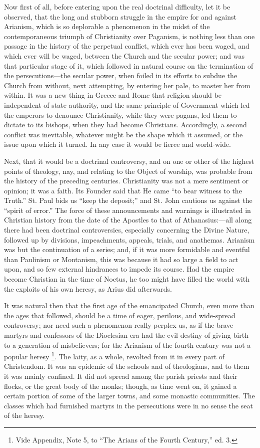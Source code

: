 Now first of all, before entering upon the real doctrinal
difficulty, let it be observed, that the long and stubborn struggle in
the empire for and against Arianism, which is so deplorable a
phenomenon in the midst of the contemporaneous triumph of Christianity
over Paganism, is nothing less than one passage in the history of the
perpetual conflict, which ever has been waged, and which ever will be
waged, between the Church and the secular power; and was that
particular stage of it, which followed in natural course on the
termination of the persecutions—the secular power, when foiled in
its efforts to subdue the Church from without, next attempting, by
entering her pale, to master her from within. It was a new thing in
Greece and Rome that religion should be independent of state
authority, and the same principle of Government which led the emperors
to denounce Christianity, while they were pagans, led them to dictate
to its bishops, when they had become Christians. Accordingly, a second
conflict was inevitable, whatever might be the shape which it
assumed, or the issue upon which it turned. In any case it would be
fierce and world-wide.

Next, that it would be a doctrinal controversy, and on one or other
of the highest points of theology, nay, and relating to the Object of
worship, was probable from the history of the preceding centuries.
Christianity was not a mere sentiment or opinion; it was a faith. Its
Founder said that He came ``to bear witness to the Truth.''
St. Paul bids us ``keep the deposit;'' and St. John cautions
us against the ``spirit of error.'' The force of these
announcements and warnings is illustrated in Christian history from
the date of the Apostles to that of Athanasius:—all along there had
been doctrinal controversies, especially concerning the Divine Nature,
followed up by divisions, impeachments, appeals, trials, and
anathemas. Arianism was but the continuation of a series; and, if it
was more formidable and eventful than Paulinism or Montanism, this was
because it had so large a field to act upon, and so few external
hindrances to impede its course. Had the empire become Christian in
the time of Noetus, he too might have filled the world with the
exploits of his own heresy, as Arius did afterwards.

It was natural then that the first age of the emancipated Church,
even more than the ages that followed, should be a time of eager,
perilous, and wide-spread controversy; nor need such a phenomenon
really perplex us, as if the brave martyrs and confessors of the
Dioclesian era had the evil destiny of giving birth to a generation of
misbelievers; for the Arianism of the fourth century was not a
popular heresy \footnote{Vide Appendix, Note 5, to ``The Arians of the Fourth
Century,'' ed. 3.}. The laity,
as a whole, revolted from it in every part of Christendom. It was an
epidemic of the schools and of theologians, and to them it was mainly
confined. It did not spread among the parish priests and their flocks,
or the great body of the monks; though, as time went on, it gained a
certain portion of some of the larger towns, and some monastic
communities. The classes which had furnished martyrs in the
persecutions were in no sense the seat of the heresy.

